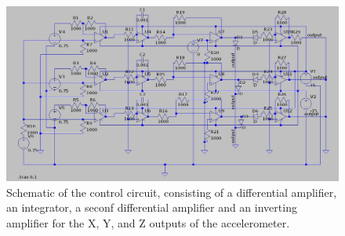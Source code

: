 
\begin{figure}[h]
	\centering
	\includegraphics[width=\textwidth]{ctrl.jpg}
	\caption{Schematic of the control circuit, consisting of a differential amplifier, an integrator, a seconf differential amplifier and an inverting amplifier for the X, Y, and Z outputs of the accelerometer.}
	\label{fig:ctrl}
\end{figure}

